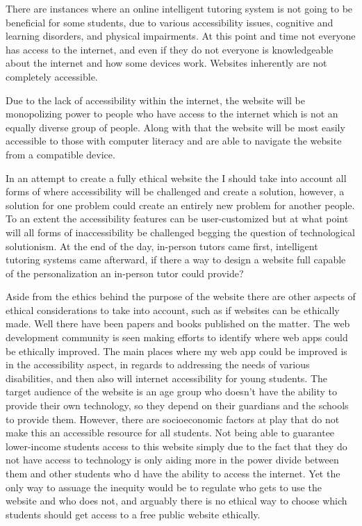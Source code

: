 \documentclass[10pt,twocolumn]{article}
\begin{document}
There are instances where an online intelligent tutoring system is not going to be beneficial for some students, due to various accessibility issues, cognitive and learning disorders, and physical impairments. At this point and time not everyone has access to the internet, and even if they do not everyone is knowledgeable about the internet and how some devices work. Websites inherently are not completely accessible.

Due to the lack of accessibility within the internet, the website will be monopolizing power to people who have access to the internet which is not an equally diverse group of people. Along with that the website will be most easily accessible to those with computer literacy and are able to navigate the website from a compatible device. 

In an attempt to create a fully ethical website the I should take into account all forms of where accessibility will be challenged and create a solution, however, a solution for one problem could create an entirely new problem for another people. To an extent the accessibility features can be user-customized but at what point will all forms of inaccessibility be challenged begging the question of technological solutionism. At the end of the day, in-person tutors came first, intelligent tutoring systems came afterward, if there a way to design a website full capable of the personalization an in-person tutor could provide?

Aside from the ethics behind the purpose of the website there are other aspects of ethical considerations to take into account, such as if websites can be ethically made. Well there have been papers and books published on the matter. The web development community is seen making efforts to identify where web apps could be ethically improved. The main places where my web app could be improved is in the accessibility aspect, in regards to addressing the needs of various disabilities, and then also will internet accessibility for young students. The target audience of the website is an age group who doesn't have the ability to provide their own technology, so they depend on their guardians and the schools to provide them. However, there are socioeconomic factors at play that do not make this an accessible resource for all students. Not being able to guarantee lower-income students access to this website simply due to the fact that they do not have access to technology is only aiding more in the power divide between them and other students who d have the ability to access the internet. Yet the only way to assuage the inequity would be to regulate who gets to use the website and who does not, and arguably there is no ethical way to choose which students should get access to a free public website ethically.  
\end{document}

